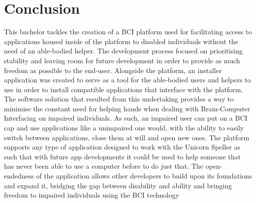 
\chapter{Conclusion}\label{cap:ending}
This bachelor tackles the creation of a BCI platform used for facilitating access to applications housed inside of the platform to disabled individuals without the need of an able-bodied helper.
\vspace{\baselineskip}\newline
The development process focused on prioritising stability and leaving room for future development in order to provide as much freedom as possible to the end-user. Alongside the platform, an installer application was created to serve as a tool for the able-bodied users and helpers to use in order to install compatible applications that interface with the platform.
\vspace{\baselineskip}\newline
The software solution that resulted from this undertaking provides a way to minimise the constant need for helping hands when dealing with Brain-Computer Interfacing on impaired individuals. As such, an impaired user can put on a BCI cap and use applications like a unimpaired one would, with the ability to easily switch between applications, close them at will and open new ones. The platform supports any type of application designed to work with the Unicorn Speller as such that with future app developments it could be used to help someone that has never been able to use a computer before to do just that. 
\vspace{\baselineskip}\newline
The open-endedness of the application allows other developers to build upon its foundations and expand it, bridging the gap between disability and ability and bringing freedom to impaired individuals using the BCI technology